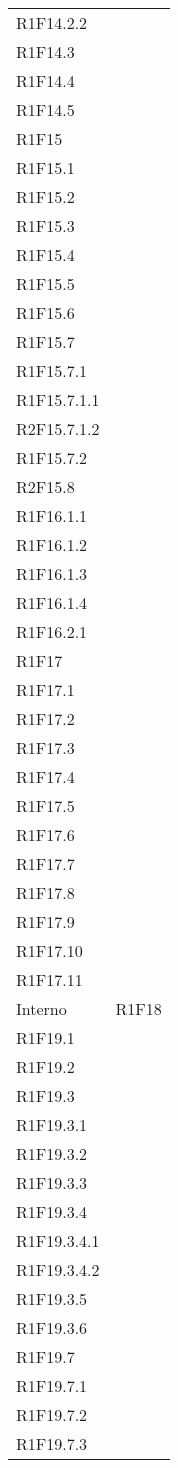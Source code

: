 \begin{longtable}{ >{\centering}p{}
			>{\centering}p{}}
	R1F14.2.2\\ 
	R1F14.3\\ 
	R1F14.4\\ 
	R1F14.5\\ 
	R1F15\\ 
	R1F15.1\\ 
	R1F15.2\\ 
	R1F15.3\\ 
	R1F15.4\\ 
	R1F15.5\\ 
	R1F15.6\\ 
	R1F15.7\\ 
	R1F15.7.1\\ 
	R1F15.7.1.1\\ 
	R2F15.7.1.2\\ 
	R1F15.7.2\\ 
	R2F15.8\\ 
	R1F16.1.1\\ 
	R1F16.1.2\\ 
	R1F16.1.3\\ 
	R1F16.1.4\\ 
	R1F16.2.1\\ 
	R1F17\\ 
	R1F17.1\\ 
	R1F17.2\\ 
	R1F17.3\\ 
	R1F17.4\\ 
	R1F17.5\\ 
	R1F17.6\\ 
	R1F17.7\\ 
	R1F17.8\\ 
	R1F17.9\\ 
	R1F17.10\\ 
	R1F17.11 \tabularnewline
	Interno	&	
	R1F18\\ 
	R1F19.1\\ 
	R1F19.2\\ 
	R1F19.3\\ 
	R1F19.3.1\\ 
	R1F19.3.2\\ 
	R1F19.3.3\\ 
	R1F19.3.4\\ 
	R1F19.3.4.1\\ 
	R1F19.3.4.2\\ 
	R1F19.3.5\\ 
	R1F19.3.6\\ 
	R1F19.7\\ 
	R1F19.7.1\\ 
	R1F19.7.2\\ 
	R1F19.7.3\\ 

\end{longtable}
